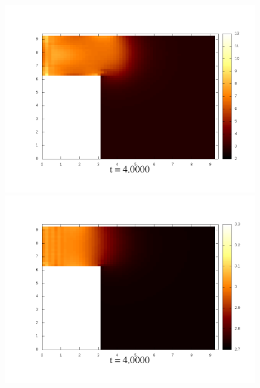 \documentclass[a4paper, 12pt]{article}
\begin{document}
\begin{figure}[h]
		\begin{minipage}[h]{0.4\linewidth}
			\includegraphics[width=1\linewidth]{./img/01_1_1/G/20}
		\end{minipage}
		\hfill
		\begin{minipage}[h]{0.4\linewidth}
			\includegraphics[width=1\linewidth]{./img/01_1_01/G/20}
		\end{minipage}
\end{figure}
\end{document}
